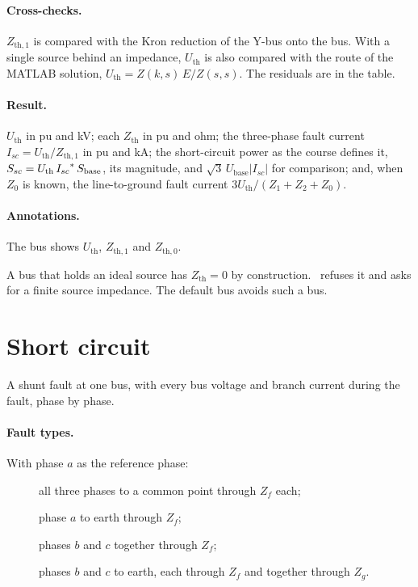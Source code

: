 \paragraph{Cross-checks.} $Z_{\text{th},1}$ is compared with the Kron reduction of the
Y-bus onto the bus. With a single source behind an impedance, $U_\text{th}$ is also
compared with the route of the MATLAB solution, $U_\text{th} = Z(k,s)\,E/Z(s,s)$. The
residuals are in the  table.

\paragraph{Result.} $U_\text{th}$ in pu and kV; each $Z_\text{th}$ in pu and ohm; the
three-phase fault current $I_{sc} = U_\text{th}/Z_{\text{th},1}$ in pu and kA; the
short-circuit power as the course defines it, $S_{sc} = U_\text{th}\,{I_{sc}}^{*}\,
S_\text{base}$, its magnitude, and $\sqrt3\,U_\text{base}|I_{sc}|$ for comparison; and,
when $Z_0$ is known, the line-to-ground fault current $3U_\text{th}/(Z_1 + Z_2 + Z_0)$.

\paragraph{Annotations.} The bus shows $U_\text{th}$, $Z_{\text{th},1}$ and
$Z_{\text{th},0}$.

\begin{note}
A bus that holds an ideal source has $Z_\text{th} = 0$ by construction. \app\ refuses it
and asks for a finite source impedance. The default bus avoids such a bus.
\end{note}

\section{Short circuit}\label{sec:study-short-circuit}

A shunt fault at one bus, with every bus voltage and branch current during the fault,
phase by phase.



\paragraph{Fault types.} With phase $a$ as the reference phase:
\begin{description}
  \item[] all three phases to a common point through $Z_f$ each;
  \item[] phase $a$ to earth through $Z_f$;
  \item[] phases $b$ and $c$ together through $Z_f$;
  \item[] phases $b$ and $c$ to earth, each through $Z_f$ and together through
    $Z_g$.
\end{description}


